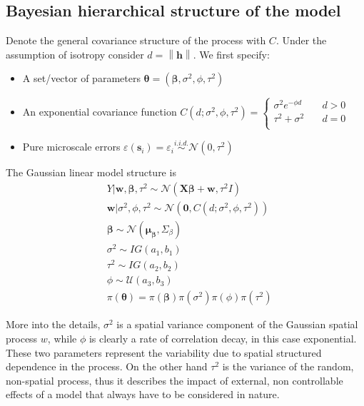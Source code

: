 \documentclass[12pt]{article}
\begin{document}
	\subsection{Bayesian hierarchical structure of the model}
	Denote the general covariance structure of the process with $C$. Under the assumption of isotropy consider $d=\left\lVert \mathbf{h} \right\rVert$. We first specify:
	\begin{itemize}
		\setlength\itemsep{2 mm}
		\item A set/vector of parameters $\boldsymbol{\theta} = (\boldsymbol{\beta}, \sigma^2, \phi, \tau^2)$
		\item An exponential covariance function
		$C(d;\sigma^2,\phi,\tau^2) = 
		\begin{cases}
		\text{$\sigma^2 e^{-\phi d}$} &\quad\text{$d > 0$}\\
		\text{$\tau^2+\sigma^2$} &\quad\text{$d = 0$}\\
		\end{cases}$
		\item Pure microscale errors $\varepsilon(\boldsymbol{s}_i)=\varepsilon_i \stackrel{i.i.d.}{\sim} \mathcal{N} (0,\tau^{2} ) $
	\end{itemize}
	The Gaussian linear model structure is
	\begin{align*}
	& Y|\mathbf{w},\boldsymbol{\beta},\tau^2 \sim \mathcal{N}(\mathbf{X}\boldsymbol{\beta} + \mathbf{w}, \tau^2 I) \\
	& \mathbf{w}|\sigma^2,\phi,\tau^2 \sim \mathcal{N}(\mathbf{0}, C(d;\sigma^2,\phi,\tau^2)) \\
	& \boldsymbol{\beta} \sim \mathcal{N}(\boldsymbol{\mu_\beta},\Sigma_\beta) \\
	& \sigma^2 \sim IG(a_1,b_1) \\
	& \tau^2 \sim IG(a_2,b_2) \\
	& \phi \sim \mathcal{U}(a_3,b_3) \\ %
	& \pi(\boldsymbol{\theta}) = \pi(\boldsymbol{\beta})\pi(\sigma^2)\pi(\phi)\pi(\tau^2)
	\end{align*}
	
\noindent
More into the details, $\sigma^2$ is a spatial variance component of the Gaussian spatial process $w$, while $\phi$ is clearly a rate of correlation decay, in this case exponential. These two parameters represent the variability due to spatial structured dependence in the process.
	On the other hand $\tau^2$ is the variance of the random, non-spatial process, thus it describes the impact of external, non controllable effects of a model that always have to be considered in nature.
	
\end{document}

